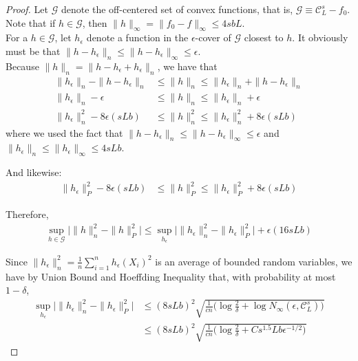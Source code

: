 \begin{proof}
Let $\mathcal{G}$ denote the off-centered set of convex functions, that is, $\mathcal{G} \equiv \mathcal{C}^s_L - f_0$. Note that if $h \in \mathcal{G}$, then $\| h \|_\infty = \| f_0 - f \|_\infty \leq 4 s b L$.\\

For a $h \in \mathcal{G}$, let $h_\epsilon$ denote a function in the $\epsilon$-cover of $\mathcal{G}$ closest to $h$. It obviously must be that $\| h - h_\epsilon \|_n \leq \| h - h_\epsilon \|_\infty \leq \epsilon$.\\

Because $\| h \|_n = \| h - h_\epsilon + h_\epsilon \|_n$, we have that
\begin{align*}
\|h_\epsilon \|_n - \| h - h_\epsilon \|_n &\leq 
    \| h \|_n \leq \|h_\epsilon \|_n + \| h - h_\epsilon \|_n \\
\|h_\epsilon \|_n - \epsilon &\leq 
    \| h \|_n \leq \|h_\epsilon \|_n + \epsilon  \\
\| h_\epsilon \|^2_n - 8 \epsilon (s L b)  &\leq \| h  \|^2_n  \leq
   \| h_\epsilon \|_n^2 + 8 \epsilon (s L b) 
\end{align*}
where we used the fact that $\| h - h_\epsilon \|_n \leq \| h - h_\epsilon \|_\infty \leq \epsilon$ and $ \| h_\epsilon \|_n \leq \| h_\epsilon \|_\infty \leq 4 s L b$.


And likewise:
\begin{align*}
\| h_\epsilon \|^2_P - 8 \epsilon (s L b)  &\leq \| h  \|^2_P \leq
   \| h_\epsilon \|_P^2 + 8 \epsilon (s L b)
\end{align*} 

Therefore, 
\begin{align*}
\sup_{h \in \mathcal{G}}  \Big| \|h\|^2_n - \|h\|^2_P \Big| \leq 
\sup_{h_\epsilon} \Big| \|h_\epsilon\|^2_n - \|h_\epsilon\|^2_P \Big| 
        + \epsilon (16 sLb)
\end{align*}

Since $\| h_\epsilon \|_n^2 = \frac{1}{n} \sum_{i=1}^n h_\epsilon(X_i)^2$ is an average of bounded random variables, we have by Union Bound and Hoeffding Inequality that, with probability at most $1 - \delta$,
\begin{align*}
\sup_{h_\epsilon} \Big| \|h_\epsilon\|^2_n - \|h_\epsilon\|^2_P \Big| &\leq
  (8sLb)^2 \sqrt{ \frac{1}{cn} \big(\log \frac{2}{\delta} 
        + \log N_\infty(\epsilon, \mathcal{C}_L^s) \big) } \\
&\leq (8sLb)^2 \sqrt{ \frac{1}{cn} \big(\log \frac{2}{\delta} 
        + C s^{1.5} Lb \epsilon^{-1/2}   \big) }
\end{align*}


\end{proof}
